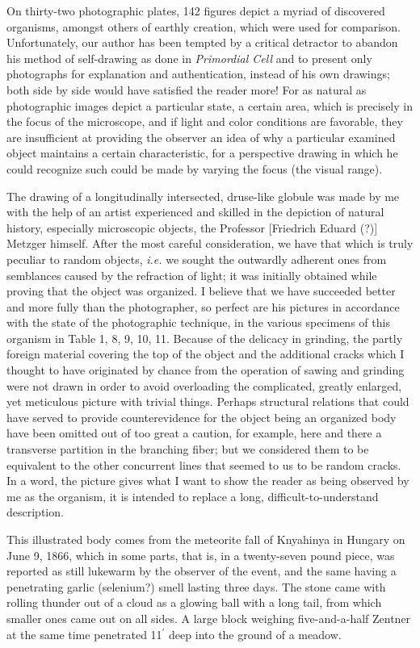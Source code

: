 \documentclass[a4paper, 12pt, oneside]{article}
\begin{document}
On thirty-two photographic plates, 142 figures depict a myriad of discovered organisms, amongst others of earthly creation, which were used for comparison. Unfortunately, our author has been tempted by a critical detractor to abandon his method of self-drawing as done in \emph{Primordial Cell} and to present only photographs for explanation and authentication, instead of his own drawings; both side by side would have satisfied the reader more! For as natural as photographic images depict a particular state, a certain area, which is precisely in the focus of the microscope, and if light and color conditions are favorable, they are insufficient at providing the observer an idea of why a particular examined object maintains a certain characteristic, for a perspective drawing in which he could recognize such could be made by varying the focus (the visual range).

The drawing of a longitudinally intersected, druse-like globule was made by me with the help of an artist experienced and skilled in the depiction of natural history, especially microscopic objects, the Professor [Friedrich Eduard (?)] Metzger himself. After the most careful consideration, we have that which is truly peculiar to random objects, \emph{i.e.} we sought the outwardly adherent ones from semblances caused by the refraction of light; it was initially obtained while proving that the object was organized. I believe that we have succeeded better and more fully than the photographer, so perfect are his pictures in accordance with the state of the photographic technique, in the various specimens of this organism in Table 1, 8, 9, 10, 11. Because of the delicacy in grinding, the partly foreign material covering the top of the object and the additional cracks which I thought to have originated by chance from the operation of sawing and grinding were not drawn in order to avoid overloading the complicated, greatly enlarged, yet meticulous picture with trivial things. Perhaps structural relations that could have served to provide counterevidence for the object being an organized body have been omitted out of too great a caution, for example, here and there a transverse partition in the branching fiber; but we considered them to be equivalent to the other concurrent lines that seemed to us to be random cracks. In a word, the picture gives what I want to show the reader as being observed by me as the organism, it is intended to replace a long, difficult-to-understand description.

This illustrated body comes from the meteorite fall of Knyahinya in Hungary on June 9, 1866, which in some parts, that is, in a twenty-seven pound piece, was reported as still lukewarm by the observer of the event, and the same having a penetrating garlic (selenium?) smell lasting three days. The stone came with rolling thunder out of a cloud as a glowing ball with a long tail, from which smaller ones came out on all sides. A large block weighing five-and-a-half Zentner at the same time penetrated 11$^\prime$ deep into the ground of a meadow.
\end{document}
